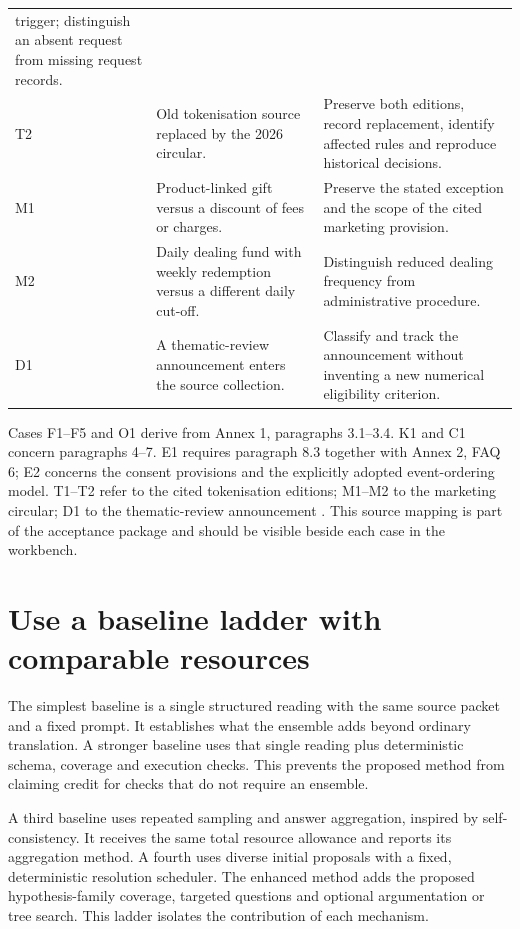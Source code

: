 \documentclass[12pt,a4paper,oneside,openany]{book}
\begin{document}
\begin{longtable}{P{0.09\textwidth}P{0.41\textwidth}P{0.4\textwidth}}
trigger; distinguish an absent request from missing request records.\\
T2 & Old tokenisation source replaced by the 2026 circular. & Preserve both editions,
record replacement, identify affected rules and reproduce historical decisions.\\
M1 & Product-linked gift versus a discount of fees or charges. & Preserve the stated
exception and the scope of the cited marketing provision.\\
M2 & Daily dealing fund with weekly redemption versus a different daily cut-off. &
Distinguish reduced dealing frequency from administrative procedure.\\
D1 & A thematic-review announcement enters the source collection. & Classify and
track the announcement without inventing a new numerical eligibility criterion.\\
\bottomrule
\end{longtable}
\endgroup

Cases F1--F5 and O1 derive from Annex 1, paragraphs 3.1--3.4. K1 and C1 concern
paragraphs 4--7. E1 requires paragraph 8.3 together with Annex 2, FAQ 6; E2 concerns
the consent provisions and the explicitly adopted event-ordering model. T1--T2
refer to the cited tokenisation editions; M1--M2 to the marketing circular; D1
to the thematic-review announcement
\citep{sfcspiannex1,sfcspiannex2,sfctoken2023,sfctoken2026,sfcmarketing,sfcreview2025}.
This source mapping is part of the acceptance package and should be visible
beside each case in the workbench.

\section{Use a baseline ladder with comparable resources}
\label{merge:M09:04}


The simplest baseline is a single structured reading with the same source packet
and a fixed prompt. It establishes what the ensemble adds beyond ordinary
translation. A stronger baseline uses that single reading plus deterministic
schema, coverage and execution checks. This prevents the proposed method from
claiming credit for checks that do not require an ensemble.

A third baseline uses repeated sampling and answer aggregation, inspired by
self-consistency. It receives the same total resource allowance and reports its
aggregation method. A fourth uses diverse initial proposals with a fixed,
deterministic resolution scheduler. The enhanced method adds the proposed
hypothesis-family coverage, targeted questions and optional argumentation or tree
search. This ladder isolates the contribution of each mechanism.
\end{document}
